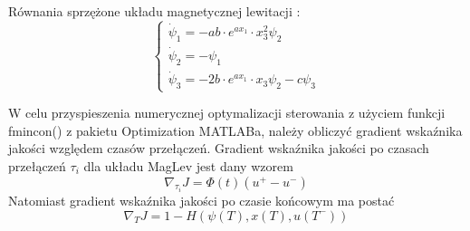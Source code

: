 Równania sprzężone układu magnetycznej lewitacji  \cite{Turnau}:
\begin{equation}
\begin{cases}
	\dot{\psi}_1 = - ab \cdot e^{ax_1} \cdot x_3^2 \psi_2 \\
	\dot{\psi}_2 = - \psi_1 \\
	\dot{\psi}_3 = -2b \cdot e^{ax_1} \cdot x_3 \psi_2 - c \psi_3
\end{cases}
\end{equation}

W celu przyspieszenia numerycznej optymalizacji sterowania z użyciem funkcji fmincon() z pakietu Optimization \textsc{MATLAB}a, należy obliczyć gradient wskaźnika jakości względem czasów przełączeń. Gradient wskaźnika jakości po czasach przełączeń $\tau_i$ dla układu MagLev jest dany wzorem
\begin{equation}
\nabla_{\tau_i} J = \Phi(t) (u^+ - u^-)
\end{equation}
Natomiast gradient wskaźnika jakości po czasie końcowym ma postać
\begin{equation}
\nabla_T J = 1 - H(\psi(T), x(T), u(T^-))
\end{equation}






